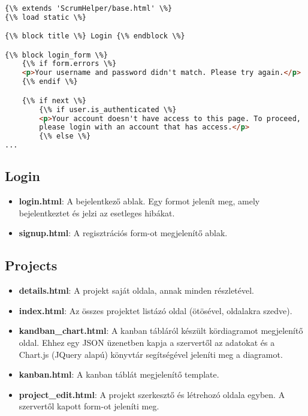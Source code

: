 \pagebreak

\begin{lstlisting}[language={html}]

{\% extends 'ScrumHelper/base.html' \%}
{\% load static \%}

{\% block title \%} Login {\% endblock \%}

{\% block login_form \%}
    {\% if form.errors \%}
    <p>Your username and password didn't match. Please try again.</p>
    {\% endif \%}

    {\% if next \%}
        {\% if user.is_authenticated \%}
        <p>Your account doesn't have access to this page. To proceed,
        please login with an account that has access.</p>
        {\% else \%}
...
\end{lstlisting}


\subsection{Login}
\begin{itemize}
	\item \textbf{login.html}: A bejelentkező ablak. Egy formot jelenít meg, amely bejelentkeztet és jelzi az esetleges hibákat.
	\item \textbf{signup.html}: A regisztrációs form-ot megjelenítő ablak.
\end{itemize}
\subsection{Projects}
\begin{itemize}
	\item \textbf{details.html}: A projekt saját oldala, annak minden részletével.
	\item \textbf{index.html}: Az összes projektet listázó oldal (ötösével, oldalakra szedve).
	\item \textbf{kandban\_chart.html}: A kanban tábláról készült kördiagramot megjelenítő oldal. Ehhez egy JSON üzenetben kapja a szervertől az adatokat és a Chart.js (JQuery alapú) könyvtár segítségével jeleníti meg a diagramot.
	\item \textbf{kanban.html}: A kanban táblát megjelenítő template.
	\item \textbf{project\_edit.html}: A projekt szerkesztő és létrehozó oldala egyben. A szervertől kapott form-ot jeleníti meg.
\end{itemize}
